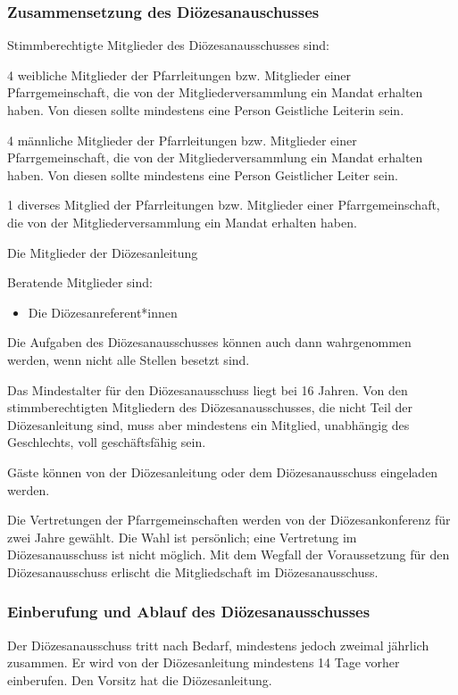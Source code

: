 \documentclass[12pt]{report}
\begin{document}
\begin{flushleft}
\subsubsection{Zusammensetzung des Diözesanauschusses}
Stimmberechtigte Mitglieder des Diözesanausschusses sind:
\begin{itemize}
  \item 4 weibliche Mitglieder der Pfarrleitungen bzw. Mitglieder einer Pfarrgemeinschaft, die von der
        Mitgliederversammlung ein Mandat erhalten haben. Von diesen sollte mindestens eine Person
        Geistliche Leiterin sein.
  \item 4 männliche Mitglieder der Pfarrleitungen bzw. Mitglieder einer Pfarrgemeinschaft, die von
        der Mitgliederversammlung ein Mandat erhalten haben. Von diesen sollte mindestens eine
        Person Geistlicher Leiter sein.
  {\color{red}\item 1 diverses Mitglied der Pfarrleitungen bzw. Mitglieder einer Pfarrgemeinschaft, die von
        der Mitgliederversammlung ein Mandat erhalten haben.}
  \item Die Mitglieder der Diözesanleitung
\end{itemize}

Beratende Mitglieder sind:
\begin{itemize}
  \item Die Diözesanreferent*innen
\end{itemize}

Die Aufgaben des Diözesanausschusses können auch dann wahrgenommen werden, wenn nicht
alle Stellen besetzt sind.

Das Mindestalter für den Diözesanausschuss liegt bei 16 Jahren. Von den stimmberechtigten Mitgliedern
des Diözesanausschusses, die nicht Teil der Diözesanleitung sind, muss aber mindestens
ein Mitglied, unabhängig des Geschlechts, voll geschäftsfähig sein.

Gäste können von der Diözesanleitung oder dem Diözesanausschuss eingeladen werden.

Die Vertretungen der Pfarrgemeinschaften werden von der Diözesankonferenz für zwei Jahre
gewählt. Die Wahl ist persönlich; eine Vertretung im Diözesanausschuss ist nicht möglich. Mit
dem Wegfall der Voraussetzung für den Diözesanausschuss erlischt die Mitgliedschaft im Diözesanausschuss.

\subsubsection{Einberufung und Ablauf des Diözesanausschusses}
Der Diözesanausschuss tritt nach Bedarf, mindestens jedoch zweimal jährlich zusammen. Er wird
von der Diözesanleitung mindestens 14 Tage vorher einberufen. Den Vorsitz hat die Diözesanleitung.


\end{flushleft}
\end{document}
